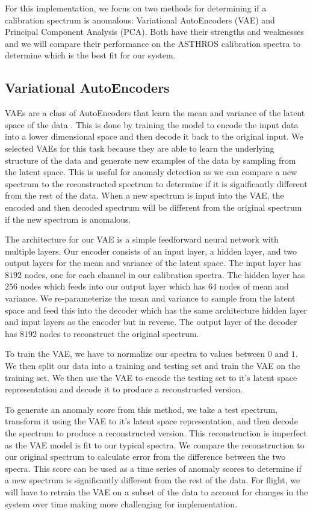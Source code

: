 For this implementation, we focus on two methods for determining if a calibration spectrum is anomalous: Variational AutoEncoders (VAE) and Principal Component Analysis (PCA).
Both have their strengths and weaknesses and we will compare their performance on the ASTHROS calibration spectra to determine which is the best fit for our system.

\subsection{Variational AutoEncoders}
VAEs are a class of AutoEncoders that learn the mean and variance of the latent space of the data \cite{kingma2022autoencodingvariationalbayes}.
This is done by training the model to encode the input data into a lower dimensional space and then decode it back to the original input.
We selected VAEs for this task because they are able to learn the underlying structure of the data and generate new examples of the data by sampling from the latent space.
This is useful for anomaly detection as we can compare a new spectrum to the reconstructed spectrum to determine if it is significantly different from the rest of the data.
When a new spectrum is input into the VAE, the encoded and then decoded spectrum will be different from the original spectrum if the new spectrum is anomalous.

The architecture for our VAE is a simple feedforward neural network with multiple layers.
Our encoder consists of an input layer, a hidden layer, and two output layers for the mean and variance of the latent space.
The input layer has $8192$ nodes, one for each channel in our calibration spectra.
The hidden layer has $256$ nodes which feeds into our output layer which has $64$ nodes of mean and variance.
We re-parameterize the mean and variance to sample from the latent space and feed this into the decoder which has the same architecture hidden layer and input layers as the encoder but in reverse.
The output layer of the decoder has $8192$ nodes to reconstruct the original spectrum.

To train the VAE, we have to normalize our spectra to values between $0$ and $1$.
We then split our data into a training and testing set and train the VAE on the training set.
We then use the VAE to encode the testing set to it's latent space representation and decode it to produce a reconstructed version.

To generate an anomaly score from this method, we take a test spectrum, transform it using the VAE to it's latent space representation, and then decode the spectrum to produce a reconstructed version.
This reconstruction is imperfect as the VAE model is fit to our typical spectra.
We compare the reconstruction to our original spectrum to calculate error from the difference between the two specra.
This score can be used as a time series of anomaly scores to determine if a new spectrum is significantly different from the rest of the data. 
For flight, we will have to retrain the VAE on a subset of the data to account for changes in the system over time making more challenging for implementation.

